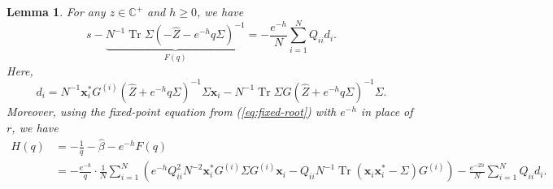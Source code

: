 \documentclass[11pt,reqno]{amsart}
\def\x{\mathbf{x}}
\def\C{\mathbb{C}}
\def\Tr{\operatorname{Tr}}
\newtheorem{lemma}[theorem]{Lemma}
\theoremstyle{definition}
\numberwithin{equation}{section}
\numberwithin{figure}{section}
\begin{document}
\begin{lemma}\label{lem:exact fixed point}
For any $z\in\C^+$ and $h\geq 0$, we have
\[
    s-\underbrace{N^{-1}\Tr\Sigma(-\hat Z-e^{-h}q\Sigma)^{-1}}_{F(q)}=-\frac{e^{-h}}{N}\sum_{i=1}^NQ_{ii}d_i.
\]
Here,
\[
    d_i=N^{-1}\x_i^*G^{(i)}(\hat Z+e^{-h}q\Sigma)^{-1}\Sigma\x_i-N^{-1}\Tr\Sigma G(\hat Z+e^{-h}q\Sigma)^{-1}\Sigma.
\]
Moreover, using the fixed-point equation from (\ref{eq:fixed-root}) with $e^{-h}$ in place of $r$, we have
\begin{align*}
    H(q)&=-\frac{1}{q}-\hat{\beta}-e^{-h}F(q)\\
    &=-\frac{e^{-h}}{q}\cdot \frac{1}{N}\sum_{i=1}^N(e^{-h}Q_{ii}^2N^{-2}\x_i^*G^{(i)}\Sigma G^{(i)}\x_i-Q_{ii}N^{-1}\Tr(\x_i\x_i^*-\Sigma)G^{(i)})-\frac{e^{-2h}}{N}\sum_{i=1}^NQ_{ii}d_i.
\end{align*}
\end{lemma}
\end{document}

